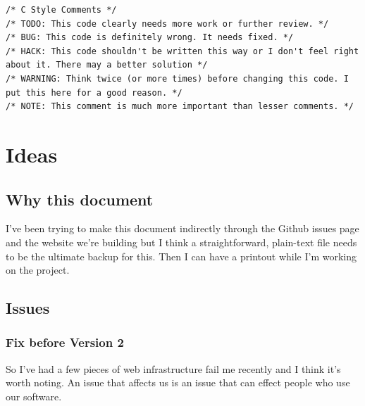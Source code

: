 \documentclass[a4paper]{report}
\begin{document}
\begin{lstlisting}
/* C Style Comments */
/* TODO: This code clearly needs more work or further review. */
/* BUG: This code is definitely wrong. It needs fixed. */
/* HACK: This code shouldn't be written this way or I don't feel right about it. There may a better solution */
/* WARNING: Think twice (or more times) before changing this code. I put this here for a good reason. */
/* NOTE: This comment is much more important than lesser comments. */
\end{lstlisting}

\section{Ideas}

\subsection{Why this document}

I've been trying to make this document indirectly through the Github
issues page and the website we're building but I think a
straightforward, plain-text file needs to be the ultimate backup for
this. Then I can have a printout while I'm working on the project.

\subsection{Issues}

\subsubsection{Fix before Version 2}

So I've had a few pieces of web infrastructure fail me recently and I
think it's worth noting. An issue that affects us is an issue that can
effect people who use our software.
\end{document}
